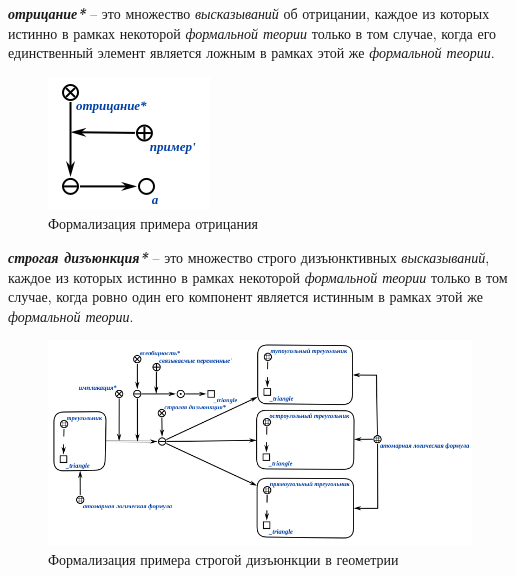 \begin{SCn}
\end{SCn}

\textbf{\textit{отрицание*}} -- это множество \textit{высказываний} об отрицании, каждое из которых истинно в рамках некоторой \textit{формальной теории} только в том случае, когда его единственный элемент является ложным в рамках этой же \textit{формальной теории}.

\begin{figure}[http]
	\includegraphics[scale=0.8]{author/part2/figures/logic/negation.png}
	\caption{Формализация примера отрицания}
	\label{fig:negation}
\end{figure}

\begin{SCn}
\end{SCn}

\textbf{\textit{строгая дизъюнкция*}} -- это множество строго дизъюнктивных \textit{высказываний}, каждое из которых истинно в рамках некоторой \textit{формальной теории} только в том случае, когда ровно один его компонент является истинным в рамках этой же \textit{формальной теории}.

\begin{figure}[http]
	\includegraphics[scale=0.8]{author/part2/figures/logic/strict_disjunction_triangle.png}
	\caption{Формализация примера строгой дизъюнкции в геометрии}
	\label{fig:strict_disjunction_triangle}
\end{figure}

